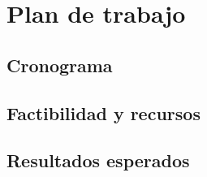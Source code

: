 \chapter{Plan de trabajo}
\section{Cronograma}
\section{Factibilidad y recursos}
\section{Resultados esperados}
